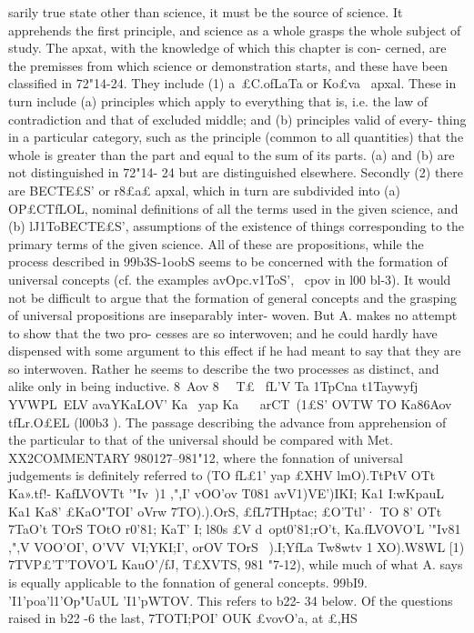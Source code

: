 {{{{{{{{{{{{{{{{{{{{{{{{{{{{{{{{{{{{{{{{{{{{{{{{{{{{{{{{{{{{{{{{{{{{{{{{{{sarily true state other than science, it must be the source of
science. It apprehends the first principle, and science as a whole
grasps the whole subject of study.
The apxat, with the knowledge of which this chapter is con-
cerned, are the premisses from which science or demonstration
starts, and these have been classified in 72"14-24. They include
(1) a~£C.ofLaTa or Ko£va~ apxal. These in turn include (a) principles
which apply to everything that is, i.e. the law of contradiction
and that of excluded middle; and (b) principles valid of every-
thing in a particular category, such as the principle (common to
all quantities) that the whole is greater than the part and equal
to the sum of its parts. (a) and (b) are not distinguished in 72"14-
24 but are distinguished elsewhere. Secondly (2) there are BECTE£S'
or r8£a£ apxal, which in turn are subdivided into (a) OP£CTfLOL,
nominal definitions of all the terms used in the given science, and
(b) lJ1ToBECTE£S', assumptions of the existence of things corresponding
to the primary terms of the given science.
All of these are propositions, while the process described in
99b3S-1oobS seems to be concerned with the formation of universal
concepts (cf. the examples avOpc.v1ToS', ~cpov in l00 bl-3). It would
not be difficult to argue that the formation of general concepts
and the grasping of universal propositions are inseparably inter-
woven. But A. makes no attempt to show that the two pro-
cesses are so interwoven; and he could hardly have dispensed
with some argument to this effect if he had meant to say that they
are so interwoven. Rather he seems to describe the two processes
as distinct, and alike only in being inductive. 8~Aov 8~ ~T£ ~fL'V
Ta 1TpCna t1Taywyfj YVWPL~ELV avaYKaLOV' Ka~ yap Ka~ ~ arCT~(1£S'
OVTW TO Ka86Aov tfLr.O£EL (l00b3 ).
The passage describing the advance from apprehension of the
particular to that of the universal should be compared with Met.
XX2COMMENTARY
980127--981"12, where the fonnation of universal judgements is
definitely referred to (TO fL£1' yap £XHV lmO).T}tPtV OTt Ka».tf!- KafLVOVTt
'"Iv~)1 ,",I' vOO'ov T081 avV1)VE')IKI; Ka1 I:wKpauL Ka1 Ka8' £KaO"TOI' oVrw
7TO).).OrS, £fL7THptac; £O'Ttl'· TO 8' OTt 7TaO't TOrS TOtO r0'81; KaT' I; l80s £V
d~opt0'81;rO't, Ka.fLVOVO'L '"Iv81 ,",V VOO'OI', O'VV~VI;YKI;I', orOV TOrS ~).I;YfLa­
Tw8wtv 1} XO).W8WL [1}) 7TVP£'T'TOVO'L KauO'/fJ, T£XVT}S, 981 "7-12), while
much of what A. says is equally applicable to the fonnation of
general concepts.
99bI9. 'I1'poa'l1'Op"UaUL 'I1'pWTOV. This refers to b22- 34 below. Of
the questions raised in b22 -6 the last, 7TOTI;POI' OUK £vovO'a, at £,HS
}}}}}}}}}}}}}}}}}}}}}}}}}}}}}}}}}}}}}}}}}}}}}}}}}}}}}}}}}}}}}}}}}}}}}}
